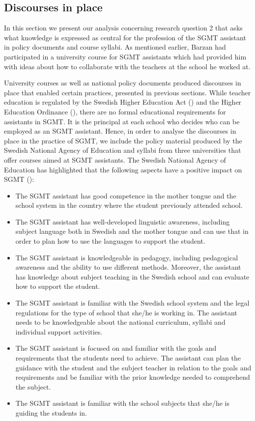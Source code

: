 \documentclass[output=paper]{langscibook}
\begin{document}
\subsection{Discourses in place} \label{sec:rosen:4.3}%

In this section we present our analysis concerning research question 2 that asks what knowledge is expressed as central for the profession of the SGMT assistant in policy documents and course syllabi. As mentioned earlier, Barzan had participated in a university course for SGMT assistants which had provided him with ideas about how to collaborate with the teachers at the school he worked at. 

University courses as well as national policy documents produced discourses in place that enabled certain practices, presented in previous sections. While teacher education is regulated by the Swedish Higher Education Act (\citealt{Swedish_ministry_of_education1992}) and the Higher Education Ordinance (\citealt{Swedish_ministry_of_education1993}), there are no formal educational requirements for assistants in SGMT. It is the principal at each school who decides who can be employed as an SGMT assistant. Hence, in order to analyse the discourses in place in the practice of SGMT, we include the policy material produced by the Swedish National Agency of Education and syllabi from three universities that offer courses aimed at SGMT assistants. The Swedish National Agency of Education has highlighted that the following aspects have a positive impact on SGMT (\citealt[32–33]{Swedish_national_agency_of_education2015}):

\begin{itemize}
\item The SGMT assistant has good competence in the mother tongue and the school system in the country where the student previously attended school.
\item The SGMT assistant has well-developed linguistic awareness, including subject language both in Swedish and the mother tongue and can use that in order to plan how to use the languages to support the student.
\item The SGMT assistant is knowledgeable in pedagogy, including pedagogical awareness and the ability to use different methods. Moreover, the assistant has knowledge about subject teaching in the Swedish school and can evaluate how to support the student.
\item The SGMT assistant is familiar with the Swedish school system and the legal regulations for the type of school that she/he is working in. The assistant needs to be knowledgeable about the national curriculum, syllabi and individual support activities.
\item The SGMT assistant is focused on and familiar with the goals and requirements that the students need to achieve. The assistant can plan the guidance with the student and the subject teacher in relation to the goals and requirements and be familiar with the prior knowledge needed to comprehend the subject.
\item The SGMT assistant is familiar with the school subjects that she/he is guiding the students in.
\end{itemize}
\end{document}
